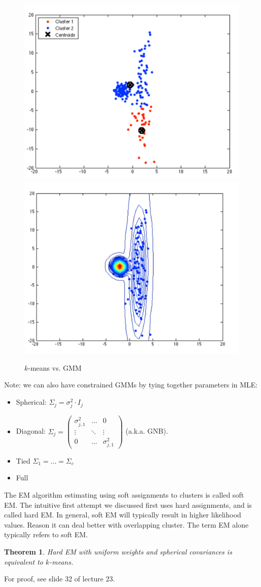 \documentclass[a4paper,10pt,twoside]{article}
\newtheorem{theorem}{Theorem}
\begin{document}
\begin{figure}
  \centering
  \includegraphics[width=.4\textwidth]{figures/kmeans.png}
  \includegraphics[width=.4\textwidth]{figures/gmm.png}
  \caption{$k$-means vs. GMM}
  \label{fig:gmmvskmeans}
\end{figure}


Note: we can also have constrained GMMs by tying together parameters in MLE:
\begin{itemize}
\item Spherical: $\Sigma_j=\sigma_j^2\cdot I_j$
\item Diagonal: $\Sigma_j=
  \begin{pmatrix}
    \sigma_{j,1}^{2} & \ldots & 0\\
    \vdots & \ddots & \vdots\\
    0 & \ldots & \sigma_{j,1}^{2}
  \end{pmatrix}
  $ (a.k.a. GNB).
\item Tied $\Sigma_1=\ldots=\Sigma_c$
\item Full
\end{itemize}

The EM algorithm estimating using soft assignments to clusters is called soft EM. The intuitive first attempt we discussed first uses hard assignments, and is called hard EM. In general, soft EM will typically result in higher likelihood values. Reason it can deal better with overlapping cluster. The term EM alone typically refers to soft EM.

\begin{theorem}
  Hard EM with uniform weights and spherical covariances is equivalent to $k$-means.
\end{theorem}
For proof, see slide 32 of lecture 23.
\end{document}
